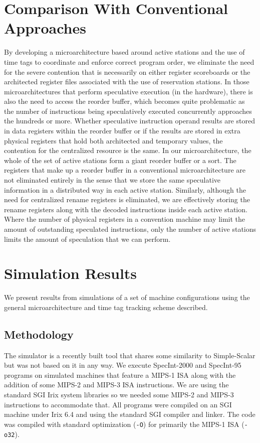 \documentclass[10pt,dvips]{article}
\begin{document}
\section{Comparison With Conventional Approaches}

By developing a microarchitecture based around active stations
and the use of time tags to coordinate and enforce correct program
order, we eliminate the need for the severe contention that is necessarily
on either register scoreboards \cite{Thornton64} 
or the architected register files associated
with the use of reservation stations.  In those microarchitectures
that perform speculative execution (in the hardware), there is also
the need to access the reorder buffer, which becomes quite problematic
as the number of instructions being speculatively executed concurrently
approaches the hundreds or more.  Whether speculative instruction operand
results are stored in data registers within the reorder buffer or if the
results are stored in extra physical registers that hold both architected
and temporary values, the contention for the centralized resource is
the same.  In our microarchitecture, the whole of the set of active
stations form a giant reorder buffer or a sort.  The registers that
make up a reorder buffer in a conventional microarchitecture are
not eliminated entirely in the sense that we store the same speculative
information in a distributed way in each active station.  Similarly,
although the need for centralized rename registers is eliminated,
we are effectively storing the rename registers along with the
decoded instructions inside each active station.  Where the number of
physical registers in a convention machine may limit the amount of
outstanding speculated instructions, only the number of active stations
limits the amount of speculation that we can perform.

\section{Simulation Results}

We present results from simulations of a set of machine configurations
using the general microarchitecture and time tag tracking scheme described.

\subsection{Methodology}
The simulator is a recently built tool that shares some similarity
to Simple-Scalar \cite{Austin97} but was not based on it in any way.  
We execute
SpecInt-2000 and SpecInt-95 programs on simulated machines
that feature a MIPS-1 ISA along with the addition of some MIPS-2 and
MIPS-3 ISA instructions.  We are using the standard SGI Irix system
libraries so we needed some MIPS-2 and MIPS-3 instructions to accommodate
that.  All programs were compiled on an SGI machine under Irix 6.4 and
using the standard SGI compiler and linker.  The code was compiled with
standard optimization ({\tt -O}) for primarily the MIPS-1 ISA ({\tt -o32}).
\end{document}
